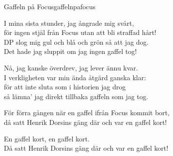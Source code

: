 \begin{song}{Gaffeln på Focus}{gaffelnpafocus}
\begin{vers}
I mina sista stunder, jag ångrade mig svårt,\\
för ingen stjäl från Focus utan att bli straffad hårt!\\
DP slog mig gul och blå och grön så att jag dog.\\
Det hade jag sluppit om jag ingen gaffel tog!\\
\end{vers}

\begin{vers}
Nå, jag kanske överdrev, jag lever ännu kvar.\\
I verkligheten var min ända åtgärd ganska klar:\\
för att inte sluta som i historien jag drog\\
så lämna' jag direkt tillbaka gaffeln som jag tog.\\
\end{vers}

\begin{vers}
För förra gången när en gaffel ifrån Focus kommit bort,\\
då satt Henrik Dorsins gäng där och var en gaffel kort!\\
\end{vers}

\begin{vers}
En gaffel kort, en gaffel kort.\\
Då satt Henrik Dorsins gäng där och var en gaffel kort!\\
\end{vers}

\end{song} 
